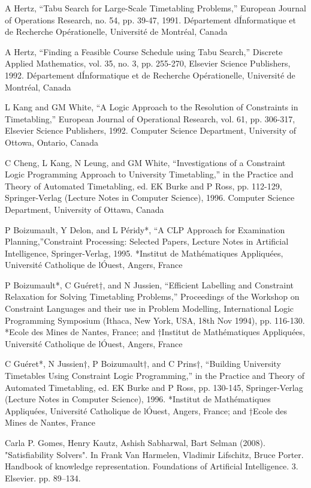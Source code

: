 \begin{thebibliography}{99}
A Hertz, “Tabu Search for Large-Scale Timetabling Problems,” European Journal of
Operations Research, no. 54, pp. 39-47, 1991. D\'epartement d\'Informatique et de
Recherche Op\'erationelle, Universit\'e de Montr\'eal, Canada

A Hertz, “Finding a Feasible Course Schedule using Tabu Search,” Discrete Applied
Mathematics, vol. 35, no. 3, pp. 255-270, Elsevier Science Publishers, 1992.
D\'epartement d\'Informatique et de Recherche Op\'erationelle, Universit\'e de
Montr\'eal, Canada

L Kang and GM White, “A Logic Approach to the Resolution of Constraints in
Timetabling,” European Journal of Operational Research, vol. 61, pp. 306-317, Elsevier
Science Publishers, 1992. Computer Science Department, University of Ottowa,
Ontario, Canada

C Cheng, L Kang, N Leung, and GM White, “Investigations of a Constraint Logic Programming Approach to University Timetabling,” in the Practice and Theory of
Automated Timetabling, ed. EK Burke and P Ross, pp. 112-129, Springer-Verlag (Lecture
Notes in Computer Science), 1996. Computer Science Department, University
of Ottawa, Canada

P Boizumault, Y Delon, and L P\'eridy*, ``A CLP Approach for Examination Planning,''Constraint Processing: Selected Papers, Lecture Notes in Artificial Intelligence,
Springer-Verlag, 1995. *Institut de Math\'ematiques Appliqu\'ees, Universit\'e Catholique
de l\'Ouest, Angers, France

P Boizumault*, C Gu\'eret†, and N Jussien, “Efficient Labelling and Constraint Relaxation for Solving Timetabling Problems,” Proceedings of the Workshop on Constraint
Languages and their use in Problem Modelling, International Logic Programming Symposium
(Ithaca, New York, USA, 18th Nov 1994), pp. 116-130. *Ecole des Mines de
Nantes, France; and †Institut de Math\'ematiques Appliqu\'ees, Universit\'e Catholique
de l\'Ouest, Angers, France

C Gu\'eret*, N Jussien†, P Boizumault†, and C Prins†, “Building University Timetables Using Constraint Logic Programming,” in the Practice and Theory of Automated
Timetabling, ed. EK Burke and P Ross, pp. 130-145, Springer-Verlag (Lecture Notes
in Computer Science), 1996. *Institut de Math\'ematiques Appliqu\'ees, Universit\'e
Catholique de l\'Ouest, Angers, France; and †Ecole des Mines de Nantes, France

Carla P. Gomes, Henry Kautz, Ashish Sabharwal, Bart Selman (2008). "Satisfiability Solvers". In Frank Van Harmelen, Vladimir Lifschitz, Bruce Porter. Handbook of knowledge representation. Foundations of Artificial Intelligence. 3. Elsevier. pp. 89–134.

\end{thebibliography}